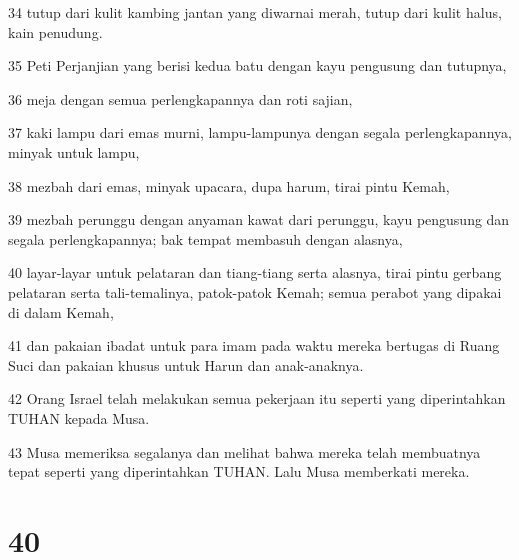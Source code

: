 \par 34 tutup dari kulit kambing jantan yang diwarnai merah, tutup dari kulit halus, kain penudung.
\par 35 Peti Perjanjian yang berisi kedua batu dengan kayu pengusung dan tutupnya,
\par 36 meja dengan semua perlengkapannya dan roti sajian,
\par 37 kaki lampu dari emas murni, lampu-lampunya dengan segala perlengkapannya, minyak untuk lampu,
\par 38 mezbah dari emas, minyak upacara, dupa harum, tirai pintu Kemah,
\par 39 mezbah perunggu dengan anyaman kawat dari perunggu, kayu pengusung dan segala perlengkapannya; bak tempat membasuh dengan alasnya,
\par 40 layar-layar untuk pelataran dan tiang-tiang serta alasnya, tirai pintu gerbang pelataran serta tali-temalinya, patok-patok Kemah; semua perabot yang dipakai di dalam Kemah,
\par 41 dan pakaian ibadat untuk para imam pada waktu mereka bertugas di Ruang Suci dan pakaian khusus untuk Harun dan anak-anaknya.
\par 42 Orang Israel telah melakukan semua pekerjaan itu seperti yang diperintahkan TUHAN kepada Musa.
\par 43 Musa memeriksa segalanya dan melihat bahwa mereka telah membuatnya tepat seperti yang diperintahkan TUHAN. Lalu Musa memberkati mereka.

\chapter{40}

